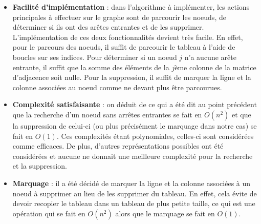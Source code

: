\begin{itemize}
\item \textbf{Facilité d'implémentation} : dans l'algorithme à implémenter, les actions principales à effectuer sur le graphe sont de parcourir les noeuds, de déterminer si ils ont des arêtes entrantes et de les supprimer. L'implémentation de ces deux fonctionnalités devient très facile. En effet, pour le parcours des noeuds, il suffit de parcourir le tableau à l'aide de boucles sur ses indices. Pour déterminer si un noeud $j$ n'a aucune arête entrante, il suffit que la somme des éléments de la $j$ème colonne de la matrice d'adjacence soit nulle. Pour la suppression, il suffit de marquer la ligne et la colonne associées au noeud comme ne devant plus être parcourues.

\item \textbf{Complexité satisfaisante} : on déduit de ce qui a été dit au point précédent que la recherche d'un noeud sans arrêtes entrantes se fait en $O(n^2)$ et que la suppression de celui-ci (ou plus précisément le marquage dans notre cas) se fait en $O(1)$. Ces complexités étant polynomiales, celles-ci sont considérées comme efficaces. De plus, d'autres représentations possibles ont été considérées et aucune ne donnait une meilleure complexité pour la recherche et la suppression.

\item \textbf{Marquage} : il a été décidé de marquer la ligne et la colonne associées à un noeud à supprimer au lieu de les supprimer du tableau. En effet, cela évite de devoir recopier le tableau dans un tableau de plus petite taille, ce qui est une opération qui se fait en $O(n^2)$ alors que le marquage se fait en $O(1)$.
\end{itemize}
